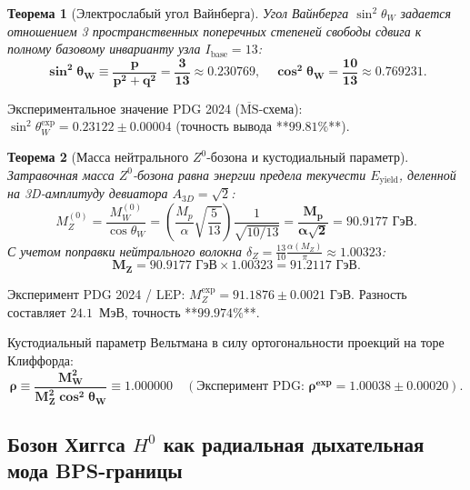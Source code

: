 \documentclass[11pt,a4paper,oneside]{article}
\theoremstyle{plain}
\newtheorem{theorem}{Теорема}[section]
\theoremstyle{definition}
\theoremstyle{remark}
\numberwithin{equation}{section}
\begin{document}
	\begin{theorem}[Электрослабый угол Вайнберга]
		Угол Вайнберга $\sin^2\theta_W$ задается отношением 3 пространственных поперечных степеней свободы сдвига к полному базовому инварианту узла $I_{\text{base}} = 13$:
		\begin{equation}
			\mathbf{\sin^2\theta_W \equiv \frac{p}{p^2+q^2} = \frac{3}{13} \approx \mathbf{0.230769}}, \quad \mathbf{\cos^2\theta_W = \frac{10}{13} \approx \mathbf{0.769231}}.
			\label{eq:weinberg_angle}
		\end{equation}
	\end{theorem}
	Экспериментальное значение PDG 2024 ($\overline{\text{MS}}$-схема): $\sin^2\theta_W^{\text{exp}} = \mathbf{0.23122 \pm 0.00004}$ (точность вывода **$99.81\%$**).
	
	\begin{theorem}[Масса нейтрального $Z^0$-бозона и кустодиальный параметр]
		Затравочная масса $Z^0$-бозона равна энергии предела текучести $E_{\text{yield}}$, деленной на 3D-амплитуду девиатора $A_{3D} = \sqrt{2}$:
		\begin{equation}
			M_Z^{(0)} = \frac{M_W^{(0)}}{\cos\theta_W} = \left( \frac{M_p}{\alpha} \sqrt{\frac{5}{13}} \right) \frac{1}{\sqrt{10/13}} = \mathbf{\frac{M_p}{\alpha \sqrt{2}} = \mathbf{90.9177 \text{ ГэВ}}}.
		\end{equation}
		С учетом поправки нейтрального волокна $\delta_Z = \frac{13}{10}\frac{\alpha(M_Z)}{\pi} \approx 1.00323$:
		\begin{equation}
			\mathbf{M_Z = 90.9177 \text{ ГэВ} \times 1.00323 = \mathbf{91.2117 \text{ ГэВ}}}.
		\end{equation}
	\end{theorem}
	Эксперимент PDG 2024 / LEP: $M_Z^{\text{exp}} = \mathbf{91.1876 \pm 0.0021 \text{ ГэВ}}$. Разность составляет $24.1$~МэВ, точность **$99.974\%$**.
	
	Кустодиальный параметр Вельтмана в силу ортогональности проекций на торе Клиффорда:
	\begin{equation}
		\mathbf{\rho \equiv \frac{M_W^2}{M_Z^2 \cos^2\theta_W} \equiv \mathbf{1.000000}} \quad (\text{Эксперимент PDG: } \mathbf{\rho^{\text{exp}} = 1.00038 \pm 0.00020}).
	\end{equation}
	
	\subsection{Бозон Хиггса $H^0$ как радиальная дыхательная мода BPS-границы}
	
\end{document}
